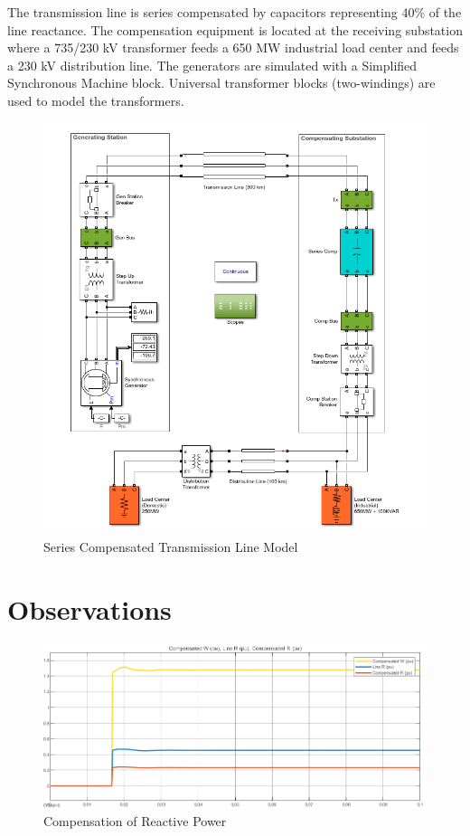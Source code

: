 \documentclass[12pt]{article}
\begin{document}
  The transmission line is series compensated by capacitors representing 40\% of the line reactance. 
  The compensation equipment is located at the receiving substation where a 735/230 kV transformer 
  feeds a 650 MW industrial load center and feeds a 230 kV distribution line.
  The generators are simulated with a Simplified Synchronous Machine block. Universal 
  transformer blocks (two-windings) are used to model the transformers.

  \begin{figure}[H]
    \centering
    \includegraphics[width=6in]{img/model.png}
    \caption{Series Compensated Transmission Line Model}
    \label{model}
  \end{figure}

  \pagebreak
  \section{Observations}  
  \begin{figure}[H]
    \centering
    \includegraphics[width=6in]{img/compennsated.png}
    \caption{Compensation of Reactive Power}
    \label{compennsated}
  \end{figure}
\end{document}
